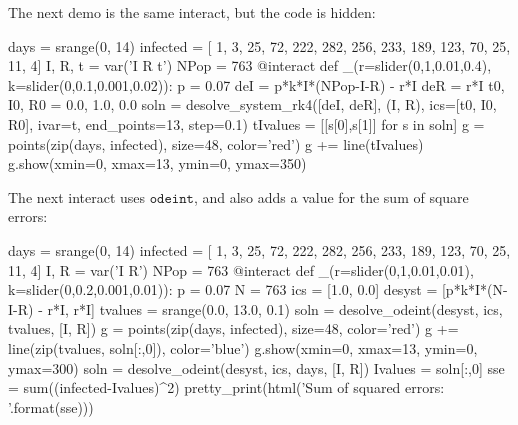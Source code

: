 \documentclass{ximera}
\begin{document}
The next demo is the same interact, but the code is hidden:

\begin{sageOutput}
days = srange(0, 14)
infected = [  1,   3,  25, 72, 222, 282, 256,
            233, 189, 123, 70,  25,  11,   4]
I, R, t = var('I R t')
NPop = 763
@interact
def _(r=slider(0,1,0.01,0.4),
      k=slider(0,0.1,0.001,0.02)):
    p = 0.07
    deI = p*k*I*(NPop-I-R) - r*I
    deR = r*I
    t0, I0, R0 = 0.0, 1.0, 0.0
    soln = desolve_system_rk4([deI, deR], (I, R),
                               ics=[t0, I0, R0], ivar=t,
                               end_points=13, step=0.1)
    tIvalues = [[s[0],s[1]] for s in soln]
    g = points(zip(days, infected), size=48, color='red')
    g += line(tIvalues)
    g.show(xmin=0, xmax=13, ymin=0, ymax=350)
\end{sageOutput}

The next interact uses $\mathtt{odeint}$, and also adds a value for the sum of square errors:

\begin{sageCell}
days = srange(0, 14)
infected = [  1,   3,  25, 72, 222, 282, 256, 
            233, 189, 123, 70,  25,  11,   4]
I, R = var('I R')
NPop = 763
@interact
def _(r=slider(0,1,0.01,0.01),
      k=slider(0,0.2,0.001,0.01)):
    p = 0.07
    N = 763    
    ics = [1.0, 0.0]
    desyst = [p*k*I*(N-I-R) - r*I, r*I]
    tvalues = srange(0.0, 13.0, 0.1)
    soln = desolve_odeint(desyst, ics, tvalues, [I, R])
    g = points(zip(days, infected), size=48, color='red')
    g += line(zip(tvalues, soln[:,0]), color='blue')
    g.show(xmin=0, xmax=13, ymin=0, ymax=300)
    soln = desolve_odeint(desyst, ics, days, [I, R])
    Ivalues = soln[:,0]
    sse = sum((infected-Ivalues)^2)
    pretty_print(html('Sum of squared errors: {}'.format(sse)))
\end{sageCell}
\end{document}
